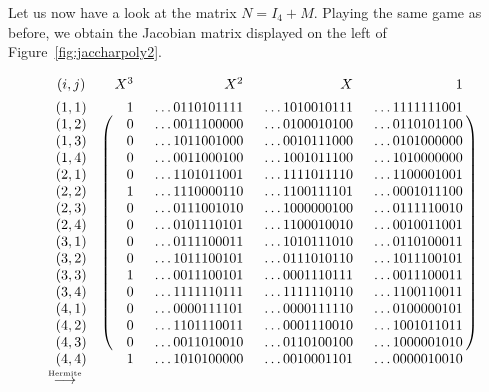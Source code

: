 \documentclass[11pt]{article}
\numberwithin{equation}{section}
\numberwithin{figure}{section}
\theoremstyle{definition}
\begin{document}
Let us now have a look at the matrix $N = I_4 + M$. Playing the same
game as before, we obtain the Jacobian matrix displayed on the left of
Figure~\ref{fig:jaccharpoly2}.
%
\begin{figure}
\hfill
{\scriptsize
$\begin{array}{cc@{}r@{\hspace{1.5em}}r@{\hspace{1.5em}}r@{\hspace{1.5em}}r@{\hspace{0.2ex}}c}
(i,j) && X^3 & X^2 & X & 1 \\
\rule[3ex]{0pt}{\baselineskip}
(1,1) &
\raisebox{0.2ex}{\multirow{16}{*}{$\left(\parbox[c][39ex]{0cm}{}\right.$}}
 &1 & \ldots0110101111 & \ldots1010010111 & \ldots1111111001 &
\raisebox{0.2ex}{\multirow{16}{*}{$\left.\parbox[c][39ex]{0cm}{}\right)$}} \\
(1,2)&&0 & \ldots0011100000 & \ldots0100010100 & \ldots0110101100 \\
(1,3)&&0 & \ldots1011001000 & \ldots0010111000 & \ldots0101000000 \\
(1,4)&&0 & \ldots0011000100 & \ldots1001011100 & \ldots1010000000 \\
(2,1)&&0 & \ldots1101011001 & \ldots1111011110 & \ldots1100001001 \\
(2,2)&&1 & \ldots1110000110 & \ldots1100111101 & \ldots0001011100 \\
(2,3)&&0 & \ldots0111001010 & \ldots1000000100 & \ldots0111110010 \\
(2,4)&&0 & \ldots0101110101 & \ldots1100010010 & \ldots0010011001 \\
(3,1)&&0 & \ldots0111100011 & \ldots1010111010 & \ldots0110100011 \\
(3,2)&&0 & \ldots1011100101 & \ldots0111010110 & \ldots1011100101 \\
(3,3)&&1 & \ldots0011100101 & \ldots0001110111 & \ldots0011100011 \\
(3,4)&&0 & \ldots1111110111 & \ldots1111110110 & \ldots1100110011 \\
(4,1)&&0 & \ldots0000111101 & \ldots0000111110 & \ldots0100000101 \\
(4,2)&&0 & \ldots1101110011 & \ldots0001110010 & \ldots1001011011 \\
(4,3)&&0 & \ldots0011010010 & \ldots0110100100 & \ldots1000001010 \\
(4,4)&&1 & \ldots1010100000 & \ldots0010001101 & \ldots0000010010
\end{array}$
\quad $\stackrel{\text{\tiny Hermite}}{\longrightarrow}$ \quad
}
\end{figure}
\end{document}
